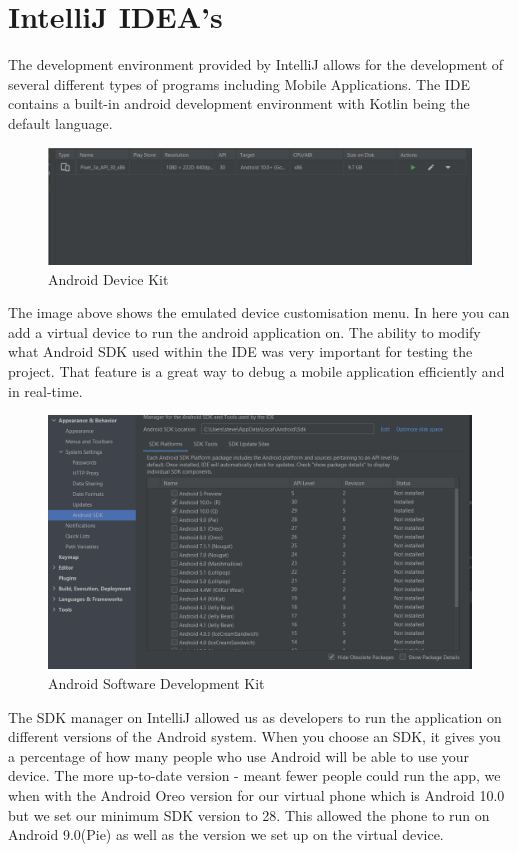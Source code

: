 \section{IntelliJ IDEA's}
The development environment provided by IntelliJ allows for the development of several different types of programs including Mobile Applications. The IDE contains a built-in android development environment with Kotlin being the default language.
\newline
\begin{figure}[H]
    \centering
    \includegraphics[width=15cm]{img/androidADK.PNG}
    \caption{Android Device Kit}
    \label{fig:adk menu}
\end{figure}
The image above shows the emulated device customisation menu. In here you can add a virtual device to run the android application on. The ability to modify what Android SDK used within the IDE was very important for testing the project. That feature is a great way to debug a mobile application efficiently and in real-time.
\begin{figure}[H]
    \centering
    \includegraphics[width=12cm]{img/androidSDK.PNG}
    \caption{Android Software Development Kit}
    \label{fig:sdk menu}
\end{figure}
The SDK manager on IntelliJ allowed us as developers to run the application on different versions of the Android system. When you choose an SDK, it gives you a percentage of how many people who use Android will be able to use your device. The more up-to-date version - meant fewer people could run the app, we when with the Android Oreo version for our virtual phone which is Android 10.0 but we set our minimum SDK version to 28. This allowed the phone to run on Android 9.0(Pie) as well as the version we set up on the virtual device.
